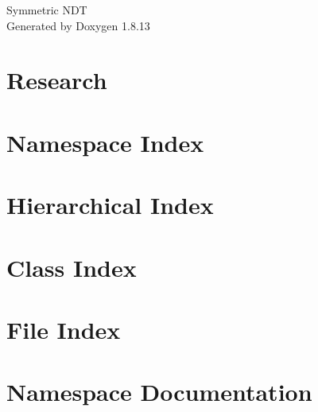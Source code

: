 \documentclass[twoside]{book}
\newcommand{\+}{\discretionary{\mbox{\scriptsize$\hookleftarrow$}}{}{}}
\newcommand{\clearemptydoublepage}{%
  \newpage{\pagestyle{empty}\cleardoublepage}%
}
\begin{document}
\hypersetup{pageanchor=false,
             bookmarksnumbered=true,
             pdfencoding=unicode
            }
\begin{titlepage}
\vspace*{7cm}
\begin{center}%
{\Large Symmetric N\+DT }\\
\vspace*{1cm}
{\large Generated by Doxygen 1.8.13}\\
\end{center}
\end{titlepage}
\clearemptydoublepage
{}
\tableofcontents
\clearemptydoublepage
{}
\hypersetup{pageanchor=true}

\chapter{Research}
\label{index}\hypertarget{index}{}
\chapter{Namespace Index}

\chapter{Hierarchical Index}

\chapter{Class Index}

\chapter{File Index}

\chapter{Namespace Documentation}










\end{document}
